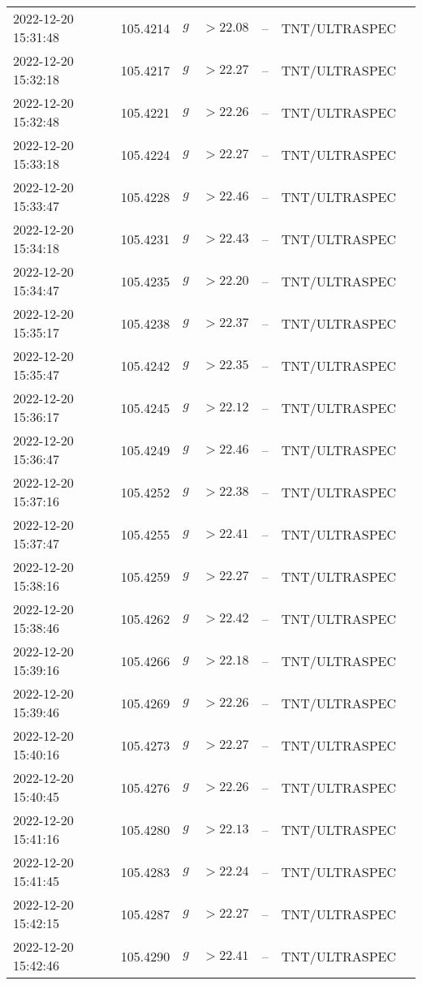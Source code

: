 \documentclass{nature_plusfigure}
\begin{document}
\begin{supplement}
\begin{center}
\begin{longtable}{lllllll}
2022-12-20 15:31:48 & 105.4214 & $g$ & $>22.08$ & -- & TNT/ULTRASPEC &  \\ 
2022-12-20 15:32:18 & 105.4217 & $g$ & $>22.27$ & -- & TNT/ULTRASPEC &  \\ 
2022-12-20 15:32:48 & 105.4221 & $g$ & $>22.26$ & -- & TNT/ULTRASPEC &  \\ 
2022-12-20 15:33:18 & 105.4224 & $g$ & $>22.27$ & -- & TNT/ULTRASPEC &  \\ 
2022-12-20 15:33:47 & 105.4228 & $g$ & $>22.46$ & -- & TNT/ULTRASPEC &  \\ 
2022-12-20 15:34:18 & 105.4231 & $g$ & $>22.43$ & -- & TNT/ULTRASPEC &  \\ 
2022-12-20 15:34:47 & 105.4235 & $g$ & $>22.20$ & -- & TNT/ULTRASPEC &  \\ 
2022-12-20 15:35:17 & 105.4238 & $g$ & $>22.37$ & -- & TNT/ULTRASPEC &  \\ 
2022-12-20 15:35:47 & 105.4242 & $g$ & $>22.35$ & -- & TNT/ULTRASPEC &  \\ 
2022-12-20 15:36:17 & 105.4245 & $g$ & $>22.12$ & -- & TNT/ULTRASPEC &  \\ 
2022-12-20 15:36:47 & 105.4249 & $g$ & $>22.46$ & -- & TNT/ULTRASPEC &  \\ 
2022-12-20 15:37:16 & 105.4252 & $g$ & $>22.38$ & -- & TNT/ULTRASPEC &  \\ 
2022-12-20 15:37:47 & 105.4255 & $g$ & $>22.41$ & -- & TNT/ULTRASPEC &  \\ 
2022-12-20 15:38:16 & 105.4259 & $g$ & $>22.27$ & -- & TNT/ULTRASPEC &  \\ 
2022-12-20 15:38:46 & 105.4262 & $g$ & $>22.42$ & -- & TNT/ULTRASPEC &  \\ 
2022-12-20 15:39:16 & 105.4266 & $g$ & $>22.18$ & -- & TNT/ULTRASPEC &  \\ 
2022-12-20 15:39:46 & 105.4269 & $g$ & $>22.26$ & -- & TNT/ULTRASPEC &  \\ 
2022-12-20 15:40:16 & 105.4273 & $g$ & $>22.27$ & -- & TNT/ULTRASPEC &  \\ 
2022-12-20 15:40:45 & 105.4276 & $g$ & $>22.26$ & -- & TNT/ULTRASPEC &  \\ 
2022-12-20 15:41:16 & 105.4280 & $g$ & $>22.13$ & -- & TNT/ULTRASPEC &  \\ 
2022-12-20 15:41:45 & 105.4283 & $g$ & $>22.24$ & -- & TNT/ULTRASPEC &  \\ 
2022-12-20 15:42:15 & 105.4287 & $g$ & $>22.27$ & -- & TNT/ULTRASPEC &  \\ 
2022-12-20 15:42:46 & 105.4290 & $g$ & $>22.41$ & -- & TNT/ULTRASPEC &  \\ 

\end{longtable}
\end{center}
\end{supplement}
\end{document}
